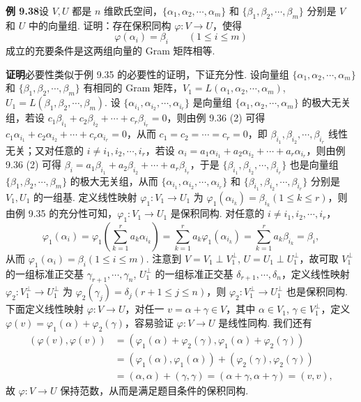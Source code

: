 \documentclass[UTF8, 12pt, fontset=fandol, oneside]{ctexart}
\begin{document}
\noindent\textbf{例 9.38}\quad 设 $V,U$ 都是 $n$ 维欧氏空间，$\{\alpha_1,\alpha_2,\cdots,\alpha_m\}$ 和 $\{\beta_1,\beta_2,\cdots,\beta_m\}$ 分别是 $V$ 和 $U$ 中的向量组. 证明：存在保积同构 $\varphi:V\to U$，使得
\[
\varphi(\alpha_i)=\beta_i\qquad (1\le i\le m)
\]
成立的充要条件是这两组向量的 Gram 矩阵相等.

\noindent\textbf{证明}\quad 必要性类似于例 9.35 的必要性的证明，下证充分性. 设向量组 $\{\alpha_1,\alpha_2,\cdots,\alpha_m\}$ 和 $\{\beta_1,\beta_2,\cdots,\beta_m\}$ 有相同的 Gram 矩阵，$V_1=L(\alpha_1,\alpha_2,\cdots,\alpha_m)$, $U_1=L(\beta_1,\beta_2,\cdots,\beta_m)$. 设 $\{\alpha_{i_1},\alpha_{i_2},\cdots,\alpha_{i_r}\}$ 是向量组 $\{\alpha_1,\alpha_2,\cdots,\alpha_m\}$ 的极大无关组，若设 $c_1\beta_{i_1}+c_2\beta_{i_2}+\cdots+c_r\beta_{i_r}=0$，则由例 9.36 (2) 可得 $c_1\alpha_{i_1}+c_2\alpha_{i_2}+\cdots+c_r\alpha_{i_r}=0$，从而 $c_1=c_2=\cdots=c_r=0$，即 $\beta_{i_1},\beta_{i_2},\cdots,\beta_{i_r}$ 线性无关；又对任意的 $i\ne i_1,i_2,\cdots,i_r$，若设 $\alpha_i=a_1\alpha_{i_1}+a_2\alpha_{i_2}+\cdots+a_r\alpha_{i_r}$，则由例 9.36 (2) 可得 $\beta_i=a_1\beta_{i_1}+a_2\beta_{i_2}+\cdots+a_r\beta_{i_r}$，于是 $\{\beta_{i_1},\beta_{i_2},\cdots,\beta_{i_r}\}$ 也是向量组 $\{\beta_1,\beta_2,\cdots,\beta_m\}$ 的极大无关组，从而 $\{\alpha_{i_1},\alpha_{i_2},\cdots,\alpha_{i_r}\}$ 和 $\{\beta_{i_1},\beta_{i_2},\cdots,\beta_{i_r}\}$ 分别是 $V_1,U_1$ 的一组基. 定义线性映射 $\varphi_1:V_1\to U_1$ 为 $\varphi_1(\alpha_{i_k})=\beta_{i_k}(1\le k\le r)$，则由例 9.35 的充分性可知，$\varphi_1:V_1\to U_1$ 是保积同构. 对任意的 $i\ne i_1,i_2,\cdots,i_r$，
\[
\varphi_1(\alpha_i)=\varphi_1\left(\sum_{k=1}^r a_k\alpha_{i_k}\right)
=\sum_{k=1}^r a_k\varphi_1(\alpha_{i_k})
=\sum_{k=1}^r a_k\beta_{i_k}=\beta_i,
\]
从而 $\varphi_1(\alpha_i)=\beta_i(1\le i\le m)$. 注意到 $V=V_1\perp V_1^\perp$, $U=U_1\perp U_1^\perp$，故可取 $V_1^\perp$ 的一组标准正交基 $\gamma_{r+1},\cdots,\gamma_n$, $U_1^\perp$ 的一组标准正交基 $\delta_{r+1},\cdots,\delta_n$，定义线性映射 $\varphi_2:V_1^\perp\to U_1^\perp$ 为 $\varphi_2(\gamma_j)=\delta_j(r+1\le j\le n)$，则 $\varphi_2:V_1^\perp\to U_1^\perp$ 也是保积同构. 下面定义线性映射 $\varphi:V\to U$，对任一 $v=\alpha+\gamma\in V$，其中 $\alpha\in V_1$, $\gamma\in V_1^\perp$，定义 $\varphi(v)=\varphi_1(\alpha)+\varphi_2(\gamma)$，容易验证 $\varphi:V\to U$ 是线性同构. 我们还有
\[
\begin{aligned}
(\varphi(v),\varphi(v))
&=(\varphi_1(\alpha)+\varphi_2(\gamma),\varphi_1(\alpha)+\varphi_2(\gamma))\\
&=(\varphi_1(\alpha),\varphi_1(\alpha))+(\varphi_2(\gamma),\varphi_2(\gamma))\\
&=(\alpha,\alpha)+(\gamma,\gamma)=(\alpha+\gamma,\alpha+\gamma)=(v,v),
\end{aligned}
\]
故 $\varphi:V\to U$ 保持范数，从而是满足题目条件的保积同构.
\end{document}
